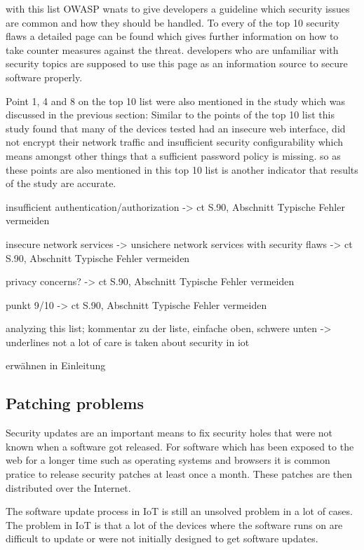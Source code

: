 \documentclass[conference]{IEEEtran}
\begin{document}
with this list OWASP wnats to give developers a guideline which security issues 
are common and how they should be handled. To every of the top 10 security 
flaws a detailed page can be found which gives further information on how to 
take counter measures against the threat. developers who are unfamiliar with 
security topics are supposed to use this page as an information source to 
secure software properly.

Point 1, 4 and 8 on the top 10 list were also mentioned in the study which 
was discussed in the previous section: Similar to the points of the top 10 list 
this study found that many of the devices tested had an insecure web interface, 
did not encrypt their network traffic and insufficient security configurability 
which means amongst other things that a sufficient password policy is missing. 
so as these points are also mentioned in this top 10 list is another indicator 
that results of the study are accurate.

insufficient authentication/authorization -> ct S.90, Abschnitt Typische Fehler 
vermeiden

insecure network services -> unsichere network services with security flaws -> 
ct S.90, Abschnitt Typische Fehler vermeiden

privacy concerns? -> ct S.90, Abschnitt Typische Fehler vermeiden

punkt 9/10 -> ct S.90, Abschnitt Typische Fehler vermeiden

analyzing this list; kommentar zu der liste, einfache oben, schwere unten -> 
underlines not a lot of 
care is taken about security in iot

erwähnen in Einleitung


\subsection{Patching problems}
Security updates are an important means to fix security holes that were 
not known when a software got released. For software which has been exposed to 
the web for a longer time such as operating systems and browsers it is common 
pratice to release security patches at least once a month. These patches are 
then distributed over the Internet.

The software update process in IoT is still an unsolved problem in a lot of 
cases. The problem in IoT is that a lot of the devices where the software runs 
on are difficult to update or were not initially designed to get software 
updates. 
\end{document}

